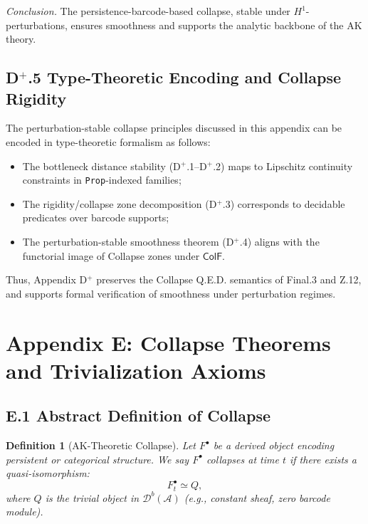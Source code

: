 \documentclass[11pt]{article}
\newtheorem{definition}[theorem]{Definition}
\begin{document}
\textit{Conclusion.}  
The persistence-barcode-based collapse, stable under \( H^1 \)-perturbations, ensures smoothness and supports the analytic backbone of the AK theory.

\subsection*{D$^+$.5 Type-Theoretic Encoding and Collapse Rigidity}

The perturbation-stable collapse principles discussed in this appendix can be encoded in  
type-theoretic formalism as follows:

\begin{itemize}
  \item The bottleneck distance stability (D$^+$.1–D$^+$.2) maps to Lipschitz continuity constraints in \texttt{Prop}-indexed families;
  \item The rigidity/collapse zone decomposition (D$^+$.3) corresponds to decidable predicates over barcode supports;
  \item The perturbation-stable smoothness theorem (D$^+$.4) aligns with the functorial image of Collapse zones under \( \mathsf{ColF} \).
\end{itemize}

Thus, Appendix D$^+$ preserves the Collapse Q.E.D. semantics of Final.3 and Z.12,  
and supports formal verification of smoothness under perturbation regimes.





\section*{Appendix E: Collapse Theorems and Trivialization Axioms}

\subsection*{E.1 Abstract Definition of Collapse}

\begin{definition}[AK-Theoretic Collapse]
Let $F^\bullet$ be a derived object encoding persistent or categorical structure.  
We say $F^\bullet$ \emph{collapses} at time $t$ if there exists a quasi-isomorphism:
\[
F^\bullet_t \simeq Q,
\]
where $Q$ is the trivial object in $\mathcal{D}^b(\mathcal{A})$ (e.g., constant sheaf, zero barcode module).
\end{definition}
\end{document}
